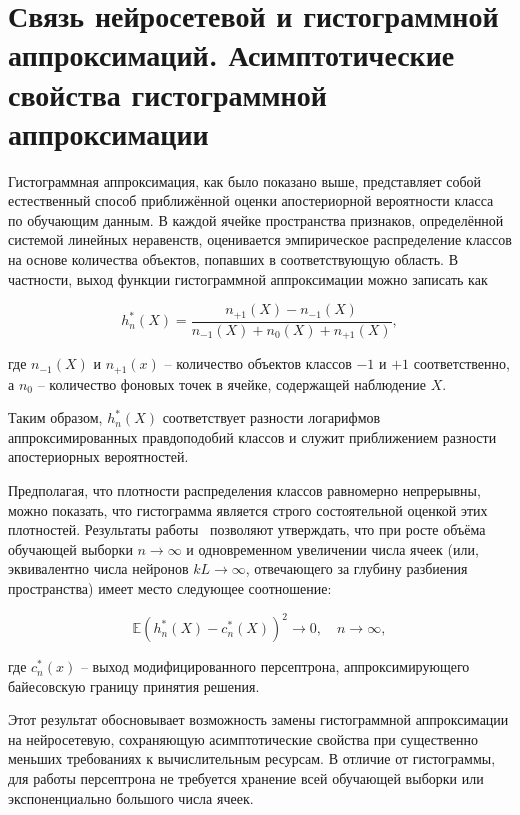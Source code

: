 \section{Связь нейросетевой и гистограммной аппроксимаций. Асимптотические свойства гистограммной аппроксимации}\label{sec:ch1/hist_neural_approximations}

Гистограммная аппроксимация, как было показано выше, представляет собой естественный способ приближённой оценки апостериорной вероятности класса по обучающим данным. В каждой ячейке пространства признаков, определённой системой линейных неравенств, оценивается эмпирическое распределение классов на основе количества объектов, попавших в соответствующую область. В частности, выход функции гистограммной аппроксимации можно записать как

\[
h_n^*(X) = \frac{n_{+1}(X) - n_{-1}(X)}{n_{-1}(X) + n_0(X) + n_{+1}(X)},
\]

где \(n_{-1}(X)\) и \(n_{+1}(x)\) -- количество объектов классов \(-1\) и \(+1\) соответственно, а \(n_0\) -- количество фоновых точек в ячейке, содержащей наблюдение \(X\).

Таким образом, \(h_n^*(X)\) соответствует разности логарифмов аппроксимированных правдоподобий классов и служит приближением разности апостериорных вероятностей.

Предполагая, что плотности распределения классов равномерно непрерывны, можно показать, что гистограмма является строго состоятельной оценкой этих плотностей. Результаты работы~\cite{devroye2013probabilistic} позволяют утверждать, что при росте объёма обучающей выборки \(n \to \infty\) и одновременном увеличении числа ячеек (или, эквивалентно числа нейронов \(kL \to \infty\), отвечающего за глубину разбиения пространства) имеет место следующее соотношение:

\begin{equation}
    \label{eq:binary_consistency}
    \mathbb{E}\left( h_n^*(X) - c_n^*(X) \right)^2 \to 0, \quad n \to \infty,    
\end{equation}

где \(c_n^*(x)\) -- выход модифицированного персептрона, аппроксимирующего байесовскую границу принятия решения.

Этот результат обосновывает возможность замены гистограммной аппроксимации на нейросетевую, сохраняющую асимптотические свойства при существенно меньших требованиях к вычислительным ресурсам. В отличие от гистограммы, для работы персептрона не требуется хранение всей обучающей выборки или экспоненциально большого числа ячеек.

